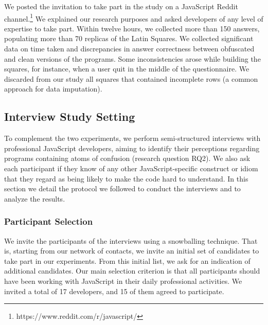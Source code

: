 We posted the invitation to take part in the study on a JavaScript Reddit channel.\footnote{https://www.reddit.com/r/javascript/} We explained our research purposes and asked developers of any level of expertise to take part. Within twelve hours, we collected more than 150 answers, populating more than 70 replicas of the Latin Squares. We collected significant data on time taken and discrepancies in answer correctness between obfuscated and clean versions of the programs. Some inconsistencies arose while building the squares, for instance, when a user quit in the middle of the questionnaire. We discarded from our study all squares that contained incomplete rows (a common approach for data imputation).

 
\subsection{Interview Study Setting}

To complement the two experiments, we perform semi-structured interviews with professional JavaScript developers, aiming to identify their perceptions regarding programs containing atoms of confusion (research question RQ2). We also ask each participant if they know of any other JavaScript-specific construct or idiom that they regard as being likely to make the code hard to understand. %
 In this section we detail the protocol we followed to conduct the interviews and to analyze the results.


\subsubsection*{Participant Selection} We invite the participants of the interviews using a snowballing technique. That is, starting from our network of contacts, we invite an initial set of candidates to take part in our experiments. From this initial list, we ask for an indication of additional candidates. Our main selection criterion is that all participants should have been working with JavaScript in their daily professional activities. We invited a total of 17 developers, and 15 of them agreed to participate.   


